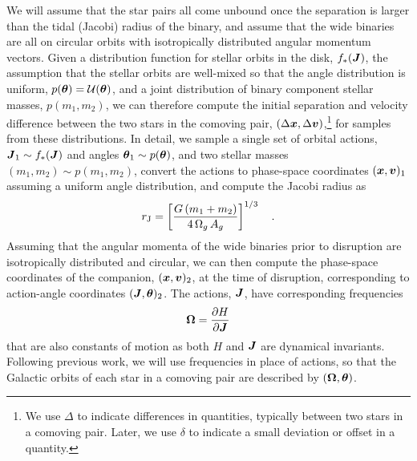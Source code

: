 \documentclass[modern, letterpaper]{aastex61}
\begin{document}
We will assume that the star pairs all come unbound once the separation is
larger than the tidal (Jacobi) radius of the binary, and assume that the wide
binaries are all on circular orbits with isotropically distributed angular
momentum vectors.
Given a distribution function for stellar orbits in the disk, $f_*(\boldsymbol{J})$, the
assumption that the stellar orbits are well-mixed so that the angle distribution
is uniform, $p(\boldsymbol{\theta}) = \mathcal{U}(\boldsymbol{\theta})$, and a joint
distribution of binary component stellar masses, $p(m_1, m_2)$, we can therefore
compute the initial separation and velocity difference between the two stars in
the comoving pair, $(\Delta \boldsymbol{x}, \Delta \boldsymbol{v})$,\footnote{We use $\Delta$ to
indicate differences in quantities, typically between two stars in a comoving
pair. Later, we use $\delta$ to indicate a small deviation or offset in a
quantity.} for samples from these distributions.
In detail, we sample a single set of orbital actions, $\boldsymbol{J}_1 \sim
f_*(\boldsymbol{J})$ and angles $\boldsymbol{\theta}_1 \sim p(\boldsymbol{\theta})$, and two stellar
masses $(m_1, m_2) \sim p(m_1, m_2)$, convert the actions to phase-space
coordinates $(\boldsymbol{x}, \boldsymbol{v})_1$ assuming a uniform angle distribution, and
compute the Jacobi radius as
\begin{equation}
    r_{\rm J} = \left[\frac{G\,(m_1 + m_2)}{4\,\Omega_g \, A_g} \right]^{1/3}\quad .
\end{equation}
Assuming that the angular momenta of the wide binaries prior to disruption are
isotropically distributed and circular, we can then compute the phase-space
coordinates of the companion, $(\boldsymbol{x}, \boldsymbol{v})_2$, at the time of disruption,
corresponding to action-angle coordinates $(\boldsymbol{J}, \boldsymbol{\theta})_2$.
The actions, $\boldsymbol{J}$, have corresponding frequencies
\begin{equation}
    \bs{\Omega} = \frac{\partial H}{\partial \bs{J}}
\end{equation}
that are also constants of motion as both $H$ and $\boldsymbol{J}$ are dynamical
invariants.
Following previous work, we will use frequencies in place of actions, so that
the Galactic orbits of each star in a comoving pair are described by
$(\boldsymbol{\Omega}, \boldsymbol{\theta})$.
\end{document}
